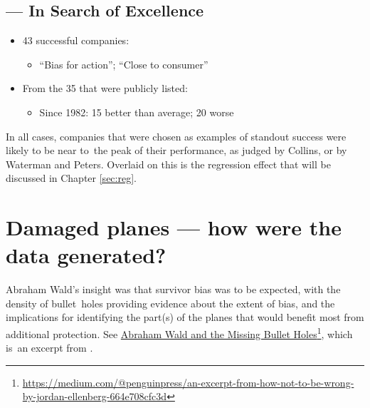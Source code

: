 \documentclass[
  10pt,
  b5paper]{book}
\providecommand{\tightlist}{%
  \setlength{\itemsep}{0pt}\setlength{\parskip}{0pt}}
\begin{document}
\hypertarget{waterman1982search-in-search-of-excellence}{%
\subsection*{\texorpdfstring{\citet{waterman1982search} --- In Search of Excellence}{@waterman1982search --- In Search of Excellence}}\label{waterman1982search-in-search-of-excellence}}

\begin{itemize}
\tightlist
\item
  43 successful companies:

  \begin{itemize}
  \tightlist
  \item
    ``Bias for action''; ``Close to consumer''
  \end{itemize}
\item
  From the 35 that were publicly listed:

  \begin{itemize}
  \tightlist
  \item
    Since 1982: 15 better than average; 20 worse
  \end{itemize}
\end{itemize}

In all cases, companies that were chosen as examples of
standout success were likely to be near to~the peak of
their performance, as judged by Collins, or by Waterman and Peters.
Overlaid on this is the regression effect that will be discussed
in Chapter \ref{sec:reg}.

\hypertarget{ss:wald}{%
\section{Damaged planes --- how were the data generated?}\label{ss:wald}}

Abraham Wald's insight was that survivor bias was to be
expected, with the density of bullet~holes providing evidence
about the extent of bias, and the implications for identifying
the part(s) of the planes that would benefit most from
additional protection. See \href{https://medium.com/@penguinpress/an-excerpt-from-how-not-to-be-wrong-by-jordan-ellenberg-664e708cfc3d}{Abraham Wald and the Missing Bullet Holes}\footnote{\url{https://medium.com/@penguinpress/an-excerpt-from-how-not-to-be-wrong-by-jordan-ellenberg-664e708cfc3d}},
which is~an excerpt from \citet{ellenberg_2015}.
\end{document}
